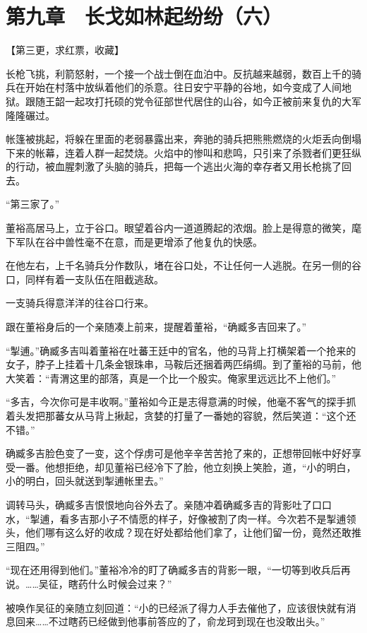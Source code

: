 \section{第九章　长戈如林起纷纷（六）}

【第三更，求红票，收藏】

长枪飞挑，利箭怒射，一个接一个战士倒在血泊中。反抗越来越弱，数百上千的骑兵在开始在村落中放纵着他们的杀意。往日安宁平静的谷地，如今变成了人间地狱。跟随王韶一起攻打托硕的党令征部世代居住的山谷，如今正被前来复仇的大军隆隆碾过。

帐篷被挑起，将躲在里面的老弱暴露出来，奔驰的骑兵把熊熊燃烧的火炬丢向倒塌下来的帐幕，连着人群一起焚烧。火焰中的惨叫和悲鸣，只引来了杀戮者们更狂纵的行动，被血腥刺激了头脑的骑兵，把每一个逃出火海的幸存者又用长枪挑了回去。

“第三家了。”

董裕高居马上，立于谷口。眼望着谷内一道道腾起的浓烟。脸上是得意的微笑，麾下军队在谷中兽性毫不在意，而是更增添了他复仇的快感。

在他左右，上千名骑兵分作数队，堵在谷口处，不让任何一人逃脱。在另一侧的谷口，同样有着一支队伍在阻截逃敌。

一支骑兵得意洋洋的往谷口行来。

跟在董裕身后的一个亲随凑上前来，提醒着董裕，“确臧多吉回来了。”

“掣逋。”确臧多吉叫着董裕在吐蕃王廷中的官名，他的马背上打横架着一个抢来的女子，脖子上挂着十几条金银珠串，马鞍后还捆着两匹绢绸。到了董裕的马前，他大笑着：“青渭这里的部落，真是一个比一个殷实。俺家里远远比不上他们。”

“多吉，今次你可是丰收啊。”董裕如今正是志得意满的时候，他毫不客气的探手抓着头发把那蕃女从马背上揪起，贪婪的打量了一番她的容貌，然后笑道：“这个还不错。”

确臧多吉脸色变了一变，这个俘虏可是他辛辛苦苦抢了来的，正想带回帐中好好享受一番。他想拒绝，却见董裕已经冷下了脸，他立刻换上笑脸，道，“小的明白，小的明白，回头就送到掣逋帐里去。”

调转马头，确臧多吉恨恨地向谷外去了。亲随冲着确臧多吉的背影吐了口口水，“掣逋，看多吉那小子不情愿的样子，好像被割了肉一样。今次若不是掣逋领头，他们哪有这么好的收成？现在好处都给他们拿了，让他们留一份，竟然还敢推三阻四。”

“现在还用得到他们。”董裕冷冷的盯了确臧多吉的背影一眼，“一切等到收兵后再说。……吴征，瞎药什么时候会过来？”

被唤作吴征的亲随立刻回道：“小的已经派了得力人手去催他了，应该很快就有消息回来……不过瞎药已经做到他事前答应的了，俞龙珂到现在也没敢出头。”

